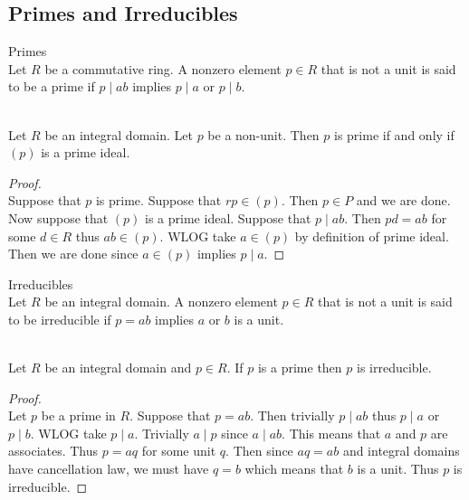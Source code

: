 \documentclass[a4paper]{article}
\begin{document}
\subsection{Primes and Irreducibles}
\begin{defn}{Primes}{}\\
Let $R$ be a commutative ring. A nonzero element $p\in R$ that is not a unit is said to be a prime if $p\;|\;ab$ implies $p\;|\;a$ or $p\;|\;b$. 
\end{defn}

\begin{lmm}{}{}\\
Let $R$ be an integral domain. Let $p$ be a non-unit. Then $p$ is prime if and only if $(p)$ is a prime ideal. 
\begin{proof}\\
Suppose that $p$ is prime. Suppose that $rp\in(p)$. Then $p\in P$ and we are done. Now suppose that $(p)$ is a prime ideal. Suppose that $p\;|\;ab$. Then $pd=ab$ for some $d\in R$ thus $ab\in(p)$. WLOG take $a\in(p)$ by definition of prime ideal. Then we are done since $a\in(p)$ implies $p\;|\;a$. 
\end{proof}
\end{lmm}

\begin{defn}{Irreducibles}{}\\
Let $R$ be an integral domain. A nonzero element $p\in R$ that is not a unit is said to be irreducible if $p=ab$ implies $a$ or $b$ is a unit. 
\end{defn}

\begin{prp}{}{}\\
Let $R$ be an integral domain and $p\in R$. If $p$ is a prime then $p$ is irreducible. 
\begin{proof}\\
Let $p$ be a prime in $R$. Suppose that $p=ab$. Then trivially $p\;|\;ab$ thus $p\;|\;a$ or $p\;|\;b$. WLOG take $p\;|\;a$. Trivially $a\;|\;p$ since $a\;|\;ab$. This means that $a$ and $p$ are associates. Thus $p=aq$ for some unit $q$. Then since $aq=ab$ and integral domains have cancellation law, we must have $q=b$ which means that $b$ is a unit. Thus $p$ is irreducible. 
\end{proof}
\end{prp}
\end{document}
